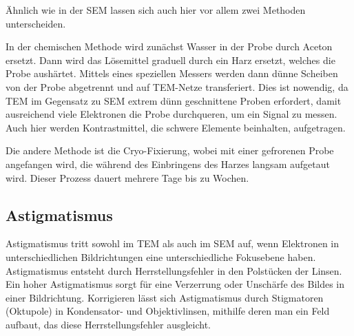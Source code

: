 Ähnlich wie in der SEM lassen sich auch hier vor allem zwei Methoden unterscheiden.

In der chemischen Methode wird zunächst Wasser in der Probe durch Aceton ersetzt.
Dann wird das Lösemittel graduell durch ein Harz ersetzt, welches die Probe aushärtet. \cite{bitesize}
Mittels eines speziellen Messers werden dann dünne Scheiben von der Probe abgetrennt und auf TEM-Netze transferiert.
Dies ist nowendig, da TEM im Gegensatz zu SEM extrem dünn geschnittene Proben erfordert, damit ausreichend viele Elektronen die Probe durchqueren, um ein Signal zu messen.
Auch hier werden Kontrastmittel, die schwere Elemente beinhalten, aufgetragen.

Die andere Methode ist die Cryo-Fixierung, wobei mit einer gefrorenen Probe angefangen wird, die während des Einbringens des Harzes langsam aufgetaut wird.
Dieser Prozess dauert mehrere Tage bis zu Wochen.



\subsection{Astigmatismus}

Astigmatismus tritt sowohl im TEM als auch im SEM auf, wenn Elektronen in unterschiedlichen Bildrichtungen eine unterschiedliche Fokusebene haben.
Astigmatismus entsteht durch Herrstellungsfehler in den Polstücken der Linsen.
Ein hoher Astigmatismus sorgt für eine Verzerrung oder Unschärfe des Bildes in einer Bildrichtung. \cite{MyScope}
Korrigieren lässt sich Astigmatismus durch Stigmatoren (Oktupole) in Kondensator- und Objektivlinsen, mithilfe deren man ein Feld aufbaut, das diese Herrstellungsfehler ausgleicht.




